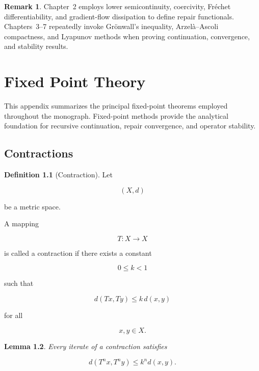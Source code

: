 \documentclass[11pt]{book}
\numberwithin{equation}{chapter}
\theoremstyle{definition}
\newtheorem{definition}{Definition}[chapter]
\newtheorem{remark}[definition]{Remark}
\theoremstyle{plain}
\newtheorem{lemma}[definition]{Lemma}
\begin{document}

\begin{remark}

Chapter~2 employs lower semicontinuity, coercivity, Fréchet
differentiability, and gradient-flow dissipation to define repair
functionals. Chapters~3--7 repeatedly invoke Grönwall's inequality,
Arzelà--Ascoli compactness, and Lyapunov methods when proving
continuation, convergence, and stability results.

\end{remark}

\chapter{Fixed Point Theory}

This appendix summarizes the principal fixed-point theorems employed
throughout the monograph. Fixed-point methods provide the analytical
foundation for recursive continuation, repair convergence, and operator
stability.


\section{Contractions}

\begin{definition}[Contraction]

Let

\[
(X,d)
\]

be a metric space.

A mapping

\[
T:X\rightarrow X
\]

is called a contraction if there exists a constant

\[
0\le k<1
\]

such that

\[
d(Tx,Ty)
\le
k\,d(x,y)
\]

for all

\[
x,y\in X.
\]

\end{definition}


\begin{lemma}

Every iterate of a contraction satisfies

\[
d(T^n x,T^n y)
\le
k^n d(x,y).
\]

\end{lemma}
\end{document}
